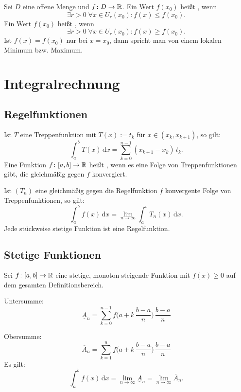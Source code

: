{}
Sei $D$ eine offene Menge und $f\colon D\to\mathbb R$. Ein Wert $f(x_0)$
heißt , wenn
\begin{equation}
\exists r{>}0\;\forall x\in U_r(x_0)\colon f(x)\le f(x_0).
\end{equation}
Ein Wert $f(x_0)$ heißt , wenn
\begin{equation}
\exists r{>}0\;\forall x\in U_r(x_0)\colon f(x)\ge f(x_0).
\end{equation}
Ist $f(x)=f(x_0)$ nur bei $x=x_0$, dann spricht man von einem
 lokalen Minimum bzw. Maximum.

\section{Integralrechnung}
\subsection{Regelfunktionen}
Ist $T$ eine Treppenfunktion
mit $T(x):=t_k$ für $x\in(x_k,x_{k+1})$,
so gilt:
\begin{equation}
\int_a^b T(x)\,\mathrm dx = \sum_{k=0}^{n-1} (x_{k+1}-x_k)\,t_k.
\end{equation}
{}
Eine Funktion $f\colon[a,b]\to\mathbb R$ heißt
, wenn es eine
Folge von Treppenfunktionen gibt, die gleichmäßig gegen $f$
konvergiert.

Ist $(T_n)$ eine gleichmäßig gegen die Regelfunktion $f$ konvergente
Folge von Treppenfunktionen, so gilt:
\begin{equation}
\int_a^b f(x)\,\mathrm dx = \lim_{n\to\infty} \int_a^b T_n(x)\,\mathrm dx.
\end{equation}
Jede stückweise stetige Funktion ist eine Regelfunktion.

\subsection{Stetige Funktionen}
Sei $f\colon [a,b]\to\mathbb R$ eine stetige, monoton steigende
Funktion mit $f(x)\ge 0$ auf dem gesamten Definitionsbereich.

Untersumme:
\begin{equation}
\underline{A}_n = \sum_{k=0}^{n-1}
f\Big(a+k\,\frac{b-a}{n}\Big)\,\frac{b-a}{n}
\end{equation}

Obersumme:
\begin{equation}
\overline{A}_n = \sum_{k=1}^{n}
f\Big(a+k\,\frac{b-a}{n}\Big)\,\frac{b-a}{n}
\end{equation}
Es gilt:
\begin{equation}
\int_a^b f(x)\,\mathrm dx
= \lim_{n\to\infty}\underline A_n
= \lim_{n\to\infty}\overline A_n.
\end{equation}

